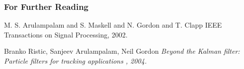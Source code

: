 \documentclass{beamer}
\begin{document}
\begin{frame}%
  \frametitle<presentation>{For Further Reading}
    
  \begin{thebibliography}{10}
    
  \beamertemplatearticlebibitems

    M. S. Arulampalam and S. Maskell and N. Gordon and T. Clapp
    \newblock IEEE Transactions on Signal Processing, 2002.
 
 
 
  \beamertemplatebookbibitems  

    Branko Ristic, Sanjeev Arulampalam, Neil Gordon
    \newblock \em Beyond the Kalman filter: Particle filters for tracking applications
     , 2004.
  \end{thebibliography}
\end{frame}


\end{document}

